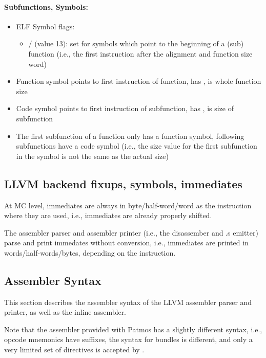 
\paragraph{Subfunctions, Symbols:}

\begin{itemize}
\item ELF Symbol flags:
  \begin{itemize}
  \item {} /  (value 13): set for symbols which point to the beginning of a (sub) function
      (i.e., the first instruction after the alignment and function size word)
  \end{itemize}
\item Function symbol points to first instruction of function, has ,  is whole function size
\item Code symbol points to first instruction of subfunction, has ,  is size of subfunction
\item The first subfunction of a function only has a function symbol, following subfunctions have a code symbol (i.e.,
  the size value for the first subfunction in the symbol is not the same as the actual size)
\end{itemize}

\subsection{LLVM backend fixups, symbols, immediates}

At MC level, immediates are always in byte/half-word/word as the instruction where they are used,
i.e., immediates are already properly shifted.

The assembler parser and assembler printer (i.e., the disassember and .s emitter) parse and print
immedates without conversion, i.e., immediates are printed in words/half-words/bytes, depending on
the instruction. 


\subsection{Assembler Syntax}

This section describes the assembler syntax of the LLVM assembler parser and printer, as well as the inline assembler.

Note that the  assembler provided with Patmos has a slightly different syntax, i.e., opcode mnemonics
have suffixes, the syntax for bundles is different, and only a very limited set of directives is accepted by .

